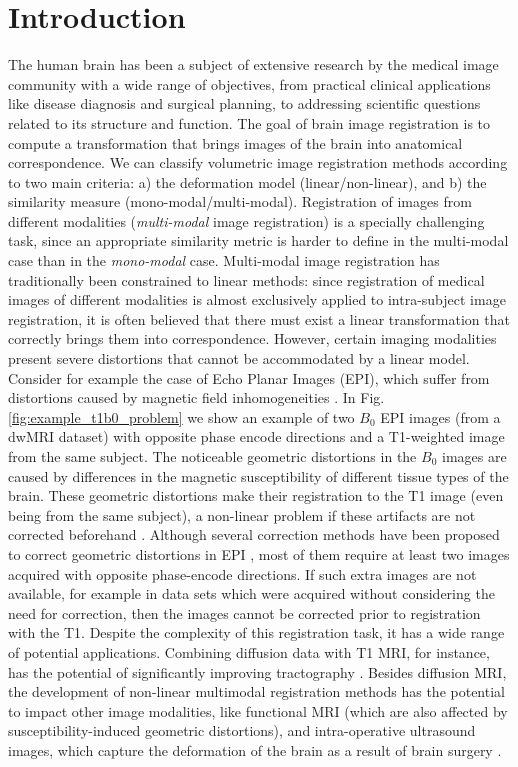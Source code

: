 \vspace{-0.5cm}
\section{Introduction}
The human brain has been a subject of extensive research by the medical image community with a wide range of objectives, from practical clinical applications like disease diagnosis and surgical planning, to addressing scientific questions related to its structure and function. The goal of brain image registration is to compute a transformation that brings images of the brain into anatomical correspondence. We can classify volumetric image registration methods according to two main criteria: a) the deformation model (linear/non-linear), and b) the similarity measure (mono-modal/multi-modal). Registration of images from different modalities (\emph{multi-modal} image registration) is a specially challenging task, since an appropriate similarity metric is harder to define in the multi-modal case than in the \emph{mono-modal} case. Multi-modal image registration has traditionally been constrained to linear methods: since registration of medical images of different modalities is almost exclusively applied to intra-subject image registration, it is often believed that there must exist a linear transformation that correctly brings them into correspondence. However, certain imaging modalities present severe distortions that cannot be accommodated by a linear model. Consider for example the case of Echo Planar Images (EPI), which suffer from distortions caused by magnetic field inhomogeneities \cite{Tournier2011, Andersson2003}. In Fig. \ref{fig:example_t1b0_problem} we show an example of two $B_{0}$ EPI images (from a dwMRI dataset) with opposite phase encode directions and a T1-weighted image from the same subject. The noticeable geometric distortions in the $B_{0}$ images are caused by differences in the magnetic susceptibility of different tissue types of the brain. These geometric distortions make their registration to the T1 image (even being from the same subject), a non-linear problem if these artifacts are not corrected beforehand \cite{Bhushan2015}. Although several correction methods have been proposed to correct geometric distortions in EPI \cite{Andersson2003, Holland2010, Ruthotto, Irfanoglu2015}, most of them require at least two images acquired with opposite phase-encode directions. If such extra images are not available, for example in data sets which were acquired without considering the need for correction, then the images cannot be corrected prior to registration with the T1. Despite the complexity of this registration task, it has a wide range of potential applications. Combining diffusion data with T1 MRI, for instance, has the potential of significantly improving tractography \cite{Smith2012, Girard2014}. Besides diffusion MRI, the development of non-linear multimodal registration methods has the potential to impact other image modalities, like functional MRI (which are also affected by susceptibility-induced geometric distortions), and intra-operative ultrasound images, which capture the deformation of the brain as a result of brain surgery \cite{Rivaz2015, DeNigris2012}.
